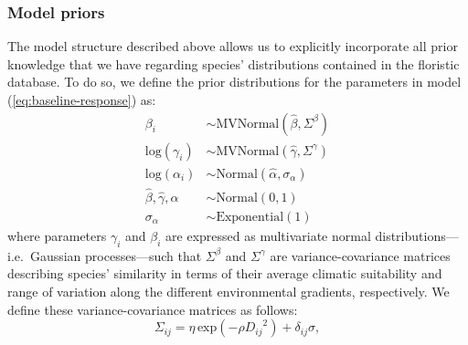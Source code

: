 \documentclass[11pt, a4paper]{article}
\begin{document}
\subsubsection*{Model priors}
The model structure described above allows us to explicitly incorporate all prior knowledge that we have regarding species' distributions contained in the floristic database. To do so, we define the prior distributions for the parameters in model (\ref{eq:baseline-response}) as:
\begin{equation} 
\begin{split}
\beta_{i}  & \sim \text{MVNormal}\left(\hat{\beta}, \Sigma^{\beta}\right)\\
\text{log}(\gamma_{i})  & \sim \text{MVNormal}\left(\hat{\gamma}, \Sigma^{\gamma}\right)\\
\text{log}(\alpha_{i}) & \sim \text{Normal}\left(\hat{\alpha}, \sigma_{\alpha}\right)\\
\hat{\beta}, 
\hat{\gamma}, 
\hat{\alpha}  & \sim \text{Normal}\left(0,1\right)\\
\sigma_{\alpha}  & \sim \text{Exponential}\left(1\right)
\end{split}
\label{eq:baseline-priors}
\end{equation} 
where parameters $\gamma_i$ and $\beta_i$ are expressed as multivariate normal distributions---i.e.~Gaussian processes---such that $\Sigma^{\beta}$ and $\Sigma^{\gamma}$ are variance-covariance matrices describing species' similarity in terms of their average climatic suitability and range of variation along the different environmental gradients, respectively. We define these variance-covariance matrices as follows:
\begin{equation} 
\Sigma_{ij} = \eta\,\text{exp}\left(-\rho {D_{ij}}^2\right) + \delta_{ij} \sigma ,
\label{eq:covariance-baseline}
\end{equation}
\end{document}
